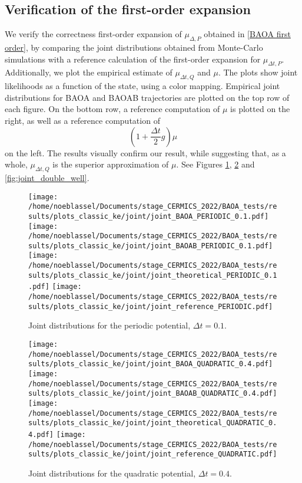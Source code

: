 \subsection{Verification of the first-order expansion}\label{muP bad muQ good}
We verify the correctness first-order expansion of $\mu_{\Delta,P}$ obtained in \eqref{BAOA first order}, by comparing the joint distributions obtained from Monte-Carlo simulations with a reference calculation of the first-order expansion for $\mu_{\Delta t,P}$. Additionally, we plot the empirical estimate of $\mu_{\Delta t,Q}$ and $\mu$.
The plots show joint likelihoods as a function of the state, using a color mapping. Empirical joint distributions for BAOA and BAOAB trajectories are plotted on the top row of each figure.
On the bottom row, a reference computation of $\mu$ is plotted on the right, as well as a reference computation of
$$\left(1+\frac{\Delta t}2g\right)\mu$$
on the left. The results visually confirm our result, while suggesting that, as a whole, $\mu_{\Delta t,Q}$ is the superior approximation of $\mu$.
See Figures \ref{fig:joint_periodic}, \ref{fig:joint_quadratic} and \ref{fig:joint_double_well}.


\begin{figure}[htbp]
  \begin{center}
    \texttt{[image: /home/noeblassel/Documents/stage\_CERMICS\_2022/BAOA\_tests/results/plots\_classic\_ke/joint/joint\_BAOA\_PERIODIC\_0.1.pdf]}
    \texttt{[image: /home/noeblassel/Documents/stage\_CERMICS\_2022/BAOA\_tests/results/plots\_classic\_ke/joint/joint\_BAOAB\_PERIODIC\_0.1.pdf]}
    \texttt{[image: /home/noeblassel/Documents/stage\_CERMICS\_2022/BAOA\_tests/results/plots\_classic\_ke/joint/joint\_theoretical\_PERIODIC\_0.1.pdf]}
    \texttt{[image: /home/noeblassel/Documents/stage\_CERMICS\_2022/BAOA\_tests/results/plots\_classic\_ke/joint/joint\_reference\_PERIODIC.pdf]}
    \caption{ \label{fig:joint_periodic}
      Joint distributions for the periodic potential, $\Delta t=0.1$.
    }
  \end{center}
\end{figure}

\begin{figure}[htbp]
  \begin{center}
    \texttt{[image: /home/noeblassel/Documents/stage\_CERMICS\_2022/BAOA\_tests/results/plots\_classic\_ke/joint/joint\_BAOA\_QUADRATIC\_0.4.pdf]}
    \texttt{[image: /home/noeblassel/Documents/stage\_CERMICS\_2022/BAOA\_tests/results/plots\_classic\_ke/joint/joint\_BAOAB\_QUADRATIC\_0.4.pdf]}
    \texttt{[image: /home/noeblassel/Documents/stage\_CERMICS\_2022/BAOA\_tests/results/plots\_classic\_ke/joint/joint\_theoretical\_QUADRATIC\_0.4.pdf]}
    \texttt{[image: /home/noeblassel/Documents/stage\_CERMICS\_2022/BAOA\_tests/results/plots\_classic\_ke/joint/joint\_reference\_QUADRATIC.pdf]}
    \caption{ \label{fig:joint_quadratic}
      Joint distributions for the quadratic potential, $\Delta t=0.4$.
    }
  \end{center}
\end{figure}

